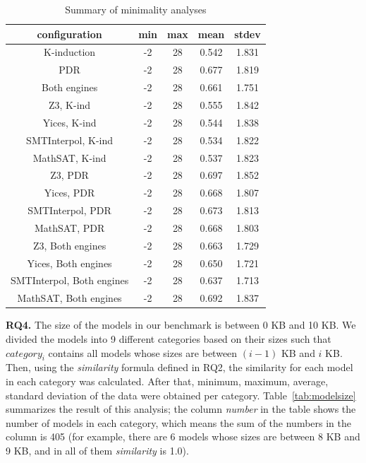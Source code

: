 \begin{table}
  \centering
  \begin{tabular}{|c|c|c|c|c|}
     \hline
     configuration & min & max & mean & stdev \\[0.5ex]
     \hline\hline
     K-induction & -2 & 28 & 0.542 & 1.831 \\[0.5ex]
     PDR & -2 & 28 & 0.677 & 1.819 \\[0.5ex]
     Both engines & -2 & 28 & 0.661 & 1.751 \\[0.5ex]
     \hline
     Z3, K-ind & -2 & 28 & 0.555 & 1.842 \\[0.5ex]
     Yices, K-ind & -2 & 28 & 0.544 & 1.838 \\[0.5ex]
     SMTInterpol, K-ind & -2 & 28 & 0.534 & 1.822 \\[0.5ex]
     MathSAT, K-ind & -2 & 28 & 0.537 & 1.823 \\[0.5ex]
     \hline
     Z3, PDR & -2 & 28 & 0.697 & 1.852 \\[0.5ex]
     Yices, PDR & -2 & 28 & 0.668 & 1.807 \\[0.5ex]
     SMTInterpol, PDR & -2 & 28 & 0.673 & 1.813 \\[0.5ex]
     MathSAT, PDR & -2 & 28 & 0.668 & 1.803 \\[0.5ex]
     \hline
     Z3, Both engines & -2 & 28 & 0.663 & 1.729 \\[0.5ex]
     Yices, Both engines & -2 & 28 & 0.650 & 1.721 \\[0.5ex]
     SMTInterpol, Both engines & -2 & 28 & 0.637 & 1.713 \\[0.5ex]
     MathSAT, Both engines & -2 & 28 & 0.692 & 1.837 \\[0.5ex]
     \hline     
   \end{tabular}
  \caption{\small{Summary of minimality analyses}}\label{tab:minimality}
\end{table}

\vspace{6pt}
\noindent{}
 \vspace{9pt}

\textbf{RQ4.} The size of the models in our benchmark is between 0 KB and 10 KB. 
We divided the models into 9 different categories based on their sizes such that $category_i$ contains
all models whose sizes are between $(i - 1)$ KB and $i$ KB. Then, using the \textit{similarity} formula defined in RQ2, the similarity for each model in each category was calculated. After that, minimum, maximum, average, standard deviation of the data were obtained per category. Table~\ref{tab:modelsize} summarizes the result of this analysis; the column \emph{number} in the table shows the number of models in each category, which means the sum of the numbers in the column is 405 (for example, there are 6 models whose sizes are between 8 KB and 9 KB, and in all of them \textit{similarity} is 1.0).
 
